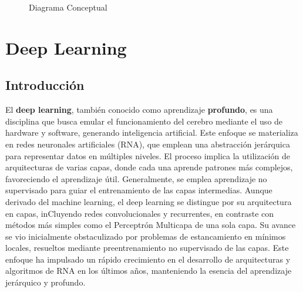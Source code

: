 \documentclass[
  a4paper,
  DIV=11,
  numbers=noendperiod]{scrreprt}
\begin{document}
\begin{figure}


\caption{\label{fig-diagrama-conceptual}Diagrama Conceptual}

\end{figure}%


\chapter{Deep Learning}\label{deep-learning}

\section{Introducción}\label{introducciuxf3n-1}

El \textbf{deep learning}, también conocido como aprendizaje
\textbf{profundo}, es una disciplina que busca emular el funcionamiento
del cerebro mediante el uso de hardware y software, generando
inteligencia artificial. Este enfoque se materializa en redes neuronales
artificiales (RNA), que emplean una abstracción jerárquica para
representar datos en múltiples niveles. El proceso implica la
utilización de arquitecturas de varias capas, donde cada una aprende
patrones más complejos, favoreciendo el aprendizaje útil. Generalmente,
se emplea aprendizaje no supervisado para guiar el entrenamiento de las
capas intermedias. Aunque derivado del machine learning, el deep
learning se distingue por su arquitectura en capas, inCluyendo redes
convolucionales y recurrentes, en contraste con métodos más simples como
el Perceptrón Multicapa de una sola capa. Su avance se vio inicialmente
obstaculizado por problemas de estancamiento en mínimos locales,
resueltos mediante preentrenamiento no supervisado de las capas. Este
enfoque ha impulsado un rápido crecimiento en el desarrollo de
arquitecturas y algoritmos de RNA en los últimos años, manteniendo la
esencia del aprendizaje jerárquico y profundo.
\end{document}

